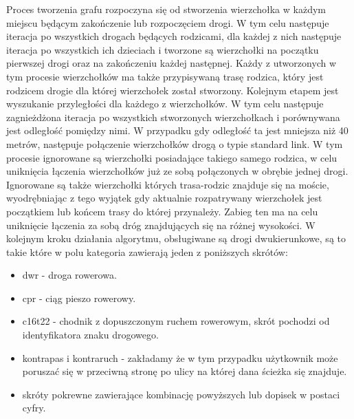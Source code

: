 Proces tworzenia grafu rozpoczyna się od stworzenia wierzchołka w każdym miejscu będącym zakończenie lub rozpoczęciem drogi. W tym celu następuje iteracja po wszystkich drogach będących rodzicami, dla każdej z nich następuje iteracja po wszystkich ich dzieciach i tworzone są wierzchołki na początku pierwszej drogi oraz na zakończeniu każdej następnej. Każdy z utworzonych w tym procesie wierzchołków ma także przypisywaną trasę rodzica, który jest rodzicem drogie dla której wierzchołek został stworzony. Kolejnym etapem jest wyszukanie przyległości dla każdego z wierzchołków. W tym celu następuje zagnieżdżona iteracja po wszystkich stworzonych wierzchołkach i porównywana jest odległość pomiędzy nimi. W przypadku gdy odległość ta jest mniejsza niż 40 metrów, następuje połączenie wierzchołków drogą o typie standard link. W tym procesie ignorowane są wierzchołki posiadające takiego samego rodzica, w celu uniknięcia łączenia wierzchołków już ze sobą połączonych w obrębie jednej drogi. Ignorowane są także wierzchołki których trasa-rodzic znajduje się na moście, wyodrębniając z tego wyjątek gdy aktualnie rozpatrywany wierzchołek jest początkiem lub końcem trasy do której przynależy. Zabieg ten ma na celu uniknięcie łączenia za sobą dróg znajdujących się na różnej wysokości.
W kolejnym kroku działania algorytmu, obsługiwane są drogi dwukierunkowe, są to takie które w polu kategoria zawierają jeden z poniższych skrótów:

\begin{itemize}
\item dwr - droga rowerowa.
\item cpr - ciąg pieszo rowerowy.
\item c16t22 - chodnik z dopuszczonym ruchem rowerowym, skrót pochodzi od identyfikatora znaku drogowego.
\item kontrapas i kontraruch - zakładamy że w tym przypadku użytkownik może poruszać się w przeciwną stronę po ulicy na której dana ścieżka się znajduje.
\item skróty pokrewne zawierające kombinację powyższych lub dopisek w postaci cyfry.
\end{itemize}

